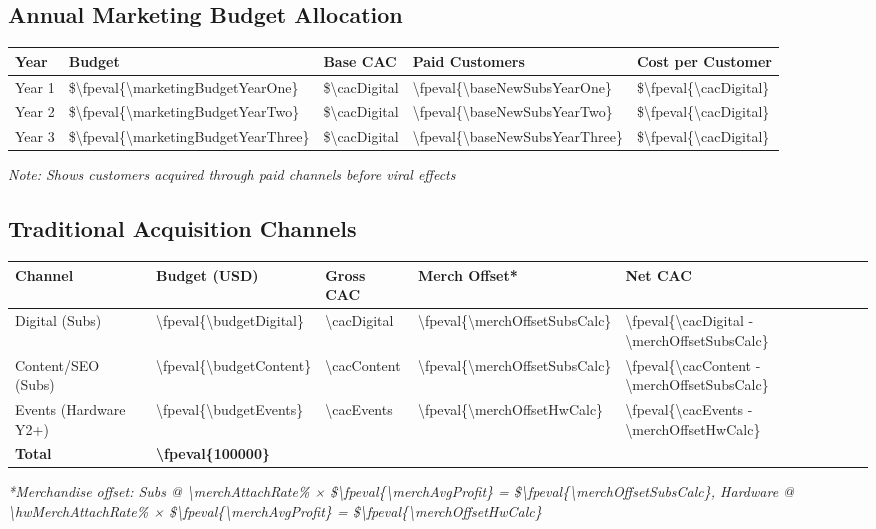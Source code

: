 \documentclass[11pt]{article}
\newcommand{\numfpeval}[1]{\num{\fpeval{#1}}}
\newcommand{\numint}[1]{\num[round-precision=0]{\fpeval{#1}}}
\begin{document}
\subsection{Annual Marketing Budget Allocation}
\begin{table}[H]
\centering
\begin{tabularx}{\linewidth}{l Y Y Y Y}
\toprule
Year & Budget & Base CAC & Paid Customers & Cost per Customer \\\midrule
Year 1 & \$\numint{\marketingBudgetYearOne} & \$\num{\cacDigital} & \numint{\baseNewSubsYearOne} & \$\numint{\cacDigital} \\
Year 2 & \$\numint{\marketingBudgetYearTwo} & \$\num{\cacDigital} & \numint{\baseNewSubsYearTwo} & \$\numint{\cacDigital} \\
Year 3 & \$\numint{\marketingBudgetYearThree} & \$\num{\cacDigital} & \numint{\baseNewSubsYearThree} & \$\numint{\cacDigital} \\
\bottomrule
\end{tabularx}
\end{table}
\textit{Note: Shows customers acquired through paid channels before viral effects}

\subsection{Traditional Acquisition Channels}
\begin{table}[H]
\centering
\begin{tabularx}{\linewidth}{l Y Y Y Y}
\toprule
Channel & Budget (USD) & Gross CAC\cite{authoranalysis2024} & Merch Offset* & Net CAC \\\midrule
Digital (Subs) & \numint{\budgetDigital} & \num{\cacDigital} & \numfpeval{\merchOffsetSubsCalc} & \numfpeval{\cacDigital - \merchOffsetSubsCalc} \\
Content/SEO (Subs) & \numint{\budgetContent} & \num{\cacContent} & \numfpeval{\merchOffsetSubsCalc} & \numfpeval{\cacContent - \merchOffsetSubsCalc} \\
Events (Hardware Y2+) & \numint{\budgetEvents} & \num{\cacEvents} & \numfpeval{\merchOffsetHwCalc} & \numfpeval{\cacEvents - \merchOffsetHwCalc} \\\midrule
\textbf{Total} & \textbf{\numint{100000}} &  &  &  \\
\bottomrule
\end{tabularx}
\end{table}
\textit{*Merchandise offset: Subs @ \num{\merchAttachRate}\% × \$\numfpeval{\merchAvgProfit} = \$\numfpeval{\merchOffsetSubsCalc}, Hardware @ \num{\hwMerchAttachRate}\% × \$\numfpeval{\merchAvgProfit} = \$\numfpeval{\merchOffsetHwCalc}}
\end{document}
